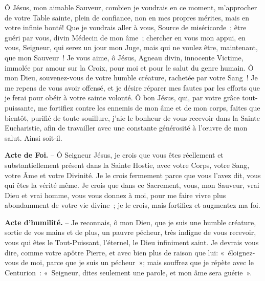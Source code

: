\begin{center}



\end{center}

\newpage
\fontsize{11.5}{13}\selectfont
\begin{center}\end{center}

Ô Jésus, mon aimable Sauveur, combien je voudrais en ce moment, m’approcher de votre Table sainte, plein de confiance, non en mes propres mérites, mais en votre infinie bonté! Que je voudrais aller à vous, Source de miséricorde~; être guéri par vous, divin Médecin de mon âme~; chercher en vous mon appui, en vous, Seigneur, qui serez un jour mon Juge, mais qui ne voulez être, maintenant, que mon Sauveur~! Je vous aime, ô Jésus, Agneau divin, innocente Victime, immolée par amour sur la Croix, pour moi et pour le salut du genre humain. Ô mon Dieu, souvenez-vous de votre humble créature, rachetée par votre Sang~! Je me repens de vous avoir offensé, et je désire réparer mes fautes par les efforts que je ferai pour obéir à votre sainte volonté. Ô bon Jésus, qui, par votre grâce tout-puissante, me fortifiez contre les ennemis de mon âme et de mon corps, faites que bientôt, purifié de toute souillure, j’aie le bonheur de vous recevoir dans la Sainte Eucharistie, afin de travailler avec une constante générosité à l’œuvre de mon salut. Ainsi soit-il.\par\vspace{0.2cm}
\begin{center}\end{center}

\textbf{Acte de Foi.} – Ô Seigneur Jésus, je crois que vous êtes réellement et substantiellement présent dans la Sainte Hostie, avec votre Corps, votre Sang, votre Âme et votre Divinité. Je le crois fermement parce que vous l’avez dit, vous qui êtes la vérité même. Je crois que dans ce Sacrement, vous, mon Sauveur, vrai Dieu et vrai homme, vous vous donnez à moi, pour me faire vivre plus abondamment de votre vie divine~; je le crois, mais fortifiez et augmentez ma foi.

\textbf{Acte d’humilité.} – Je reconnais, ô mon Dieu, que je suis une humble créature, sortie de vos mains et de plus, un pauvre pécheur, très indigne de vous recevoir, vous qui êtes le Tout-Puissant, l’éternel, le Dieu infiniment saint. Je devrais vous dire, comme votre apôtre Pierre, et avec bien plus de raison que lui: «~éloignez-vous de moi, parce que je suis un pécheur~»; mais souffrez que je répète avec le Centurion~: «~Seigneur, dites seulement une parole, et mon âme sera guérie~».


